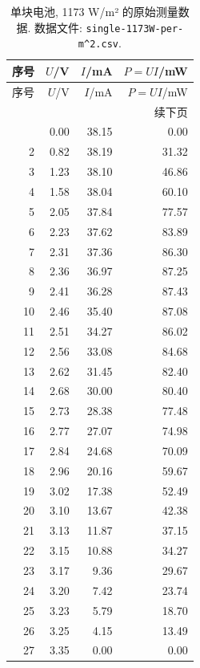 \documentclass[UTF8,a4paper,11pt]{ctexart}
\begin{document}
\begin{longtable}{rrrr}
\caption{单块电池, 1173 W/m² 的原始测量数据. 数据文件: \texttt{single-1173W-per-m\textasciicircum{}2.csv}.}\\
\toprule
序号 & $U$/V & $I$/mA & $P=UI$/mW \\
\midrule
\endfirsthead
\toprule
序号 & $U$/V & $I$/mA & $P=UI$/mW \\
\midrule
\endhead
\midrule
\multicolumn{4}{r}{续下页} \\
\endfoot
\bottomrule
\endlastfoot
1 & 0.00 & 38.15 & 0.00 \\
2 & 0.82 & 38.19 & 31.32 \\
3 & 1.23 & 38.10 & 46.86 \\
4 & 1.58 & 38.04 & 60.10 \\
5 & 2.05 & 37.84 & 77.57 \\
6 & 2.23 & 37.62 & 83.89 \\
7 & 2.31 & 37.36 & 86.30 \\
8 & 2.36 & 36.97 & 87.25 \\
9 & 2.41 & 36.28 & 87.43 \\
10 & 2.46 & 35.40 & 87.08 \\
11 & 2.51 & 34.27 & 86.02 \\
12 & 2.56 & 33.08 & 84.68 \\
13 & 2.62 & 31.45 & 82.40 \\
14 & 2.68 & 30.00 & 80.40 \\
15 & 2.73 & 28.38 & 77.48 \\
16 & 2.77 & 27.07 & 74.98 \\
17 & 2.84 & 24.68 & 70.09 \\
18 & 2.96 & 20.16 & 59.67 \\
19 & 3.02 & 17.38 & 52.49 \\
20 & 3.10 & 13.67 & 42.38 \\
21 & 3.13 & 11.87 & 37.15 \\
22 & 3.15 & 10.88 & 34.27 \\
23 & 3.17 & 9.36 & 29.67 \\
24 & 3.20 & 7.42 & 23.74 \\
25 & 3.23 & 5.79 & 18.70 \\
26 & 3.25 & 4.15 & 13.49 \\
27 & 3.35 & 0.00 & 0.00 \\
\end{longtable}
\newpage
\end{document}
